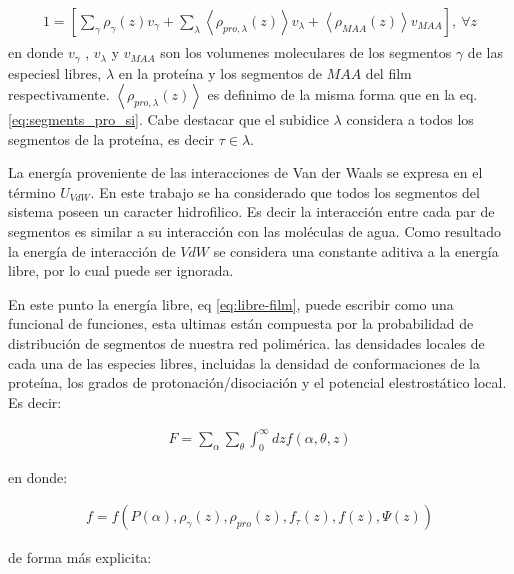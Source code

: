 \begin{align}
	\begin{aligned}
		1=  {\left[\sum_{\gamma}\rho_\gamma(z) v_\gamma + \sum_\lambda{\left<\rho_{pro,\lambda}(z)\right>v_\lambda} + \left<\rho_{MAA}(z)\right>v_{MAA} \right]},~ \forall z
	\end{aligned}
	\label{eq:constraint}
\end{align}
\noindent en donde $v_\gamma$ , $v_\lambda$ y $v_{MAA}$ son los volumenes moleculares de los segmentos $\gamma$ de las especiesl libres, $\lambda$  en la prote\'ina y los segmentos de $MAA$ del film respectivamente.
$\left<\rho_{pro,\lambda}(z)\right>$ es definimo de la misma forma que en la eq.  \ref{eq:segments_pro_si}.
Cabe destacar que el subidice $\lambda$ considera a todos los segmentos de la prote\'ina, es decir $ \tau \in \lambda$.

La energ\'ia proveniente de las interacciones de Van der Waals se expresa en el t\'ermino $U_{VdW}$. En este trabajo se ha considerado que todos los segmentos del sistema poseen un caracter hidrofilico. Es decir la interacci\'on entre cada par de segmentos es similar a su interacci\'on con las mol\'eculas de agua. Como resultado la energ\'ia de interacci\'on de $VdW$ se considera una constante aditiva a la energ\'ia libre, por lo cual puede ser ignorada.

En este punto la energ\'ia libre, eq \ref{eq:libre-film}, puede escribir como una funcional de funciones, esta ultimas est\'an compuesta por la probabilidad de distribuci\'on de segmentos de nuestra red polim\'erica. las densidades locales de cada una de las especies libres, incluidas la densidad de conformaciones de la prote\'ina, los grados de protonaci\'on/disociaci\'on y el potencial elestrost\'atico local. Es decir:

\begin{align}
	F = \sum_\alpha \sum_\theta \int_0^\infty dz f(\alpha, \theta,z)
\end{align}

\noindent en donde:

\begin{align}
	 f=  f \left( P(\alpha), \rho_\gamma(z),\rho_{pro}(z), f_\tau(z), f(z), \Psi(z)  \right)
	 \label{eq:funcionales}
 \end{align}

de forma m\'as explicita:

